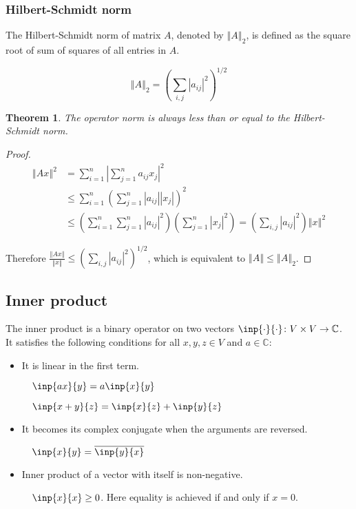 \documentclass[twofold]{article}
\newcommand*\conj[1]{\overline{#1}}
\newcommand*\norm[1]{\left \Vert #1 \right\Vert}
\newcommand*\abs[1]{\left \vert #1 \right\vert}
\theoremstyle{plain}
\newtheorem{theorem}{Theorem}
\theoremstyle{definition}
\theoremstyle{remark}
\begin{document}
\subsubsection{Hilbert-Schmidt norm}

The Hilbert-Schmidt norm of matrix \(A\), denoted by \(\norm{A}_2\),  is defined as the square root of sum of squares of all entries in \(A\). 

 \[\norm{A}_2 = \left( \sum_{i, j} \abs{a_{ij}}^2 \right) ^{1/2}\]


\begin{theorem} The operator norm is always less than or equal to the Hilbert-Schmidt norm. \end{theorem}

\begin{proof}
 \begin{equation*} \begin{split} 
\norm{Ax}^2 & = \sum_{i = 1} ^ n \abs{\sum_{j = 1} ^ n a_{ij} x_j}^2 \\
& \le  \sum_{i = 1} ^ n \left( \sum_{j = 1} ^ n \abs{a_{ij}} \abs{ x_j}\right) ^2 \\
& \le \left( \sum_{i = 1}^n \sum_{j = 1}^n \abs{a_{ij}}^2\right) \left( \sum_{j=1}^n \abs{x_j}^2 \right)  = \left( \sum_{i, j} \abs{a_{ij}}^2 \right) \norm{x}^2
\end{split}
\end{equation*} 

Therefore \(\displaystyle \frac{\norm{Ax}}{\norm{x}} \le \left( \sum_{i, j} \abs{a_{ij}}^2 \right) ^{1/2}\), which is equivalent to \(\norm{A} \le \norm{A}_2\).
\end{proof}



\subsection{Inner product}

The inner product is a binary operator on two vectors \(\inp{\cdot}{\cdot} \colon V  \times  V \to \mathbb{C}\). It  satisfies the following conditions for all \(x, y, z \in V\) and \(a \in \mathbb{C}\):

\begin{itemize}
\item It is linear in the first term. 

\(\quad \inp{ax}{y} = a \inp{x}{y}\)
 
\(\quad \inp{x + y}{z} = \inp{x}{z} + \inp{y}{z}\)

\item It becomes its complex conjugate when the arguments are reversed.

\(\quad \inp{x}{y} = \conj{\inp{y}{x}}\)

\item Inner product of a vector with itself is non-negative. 

\(\quad \inp{x}{x} \ge 0\). Here equality is achieved if and only if \(x = 0\).
\end{itemize}
\end{document}
